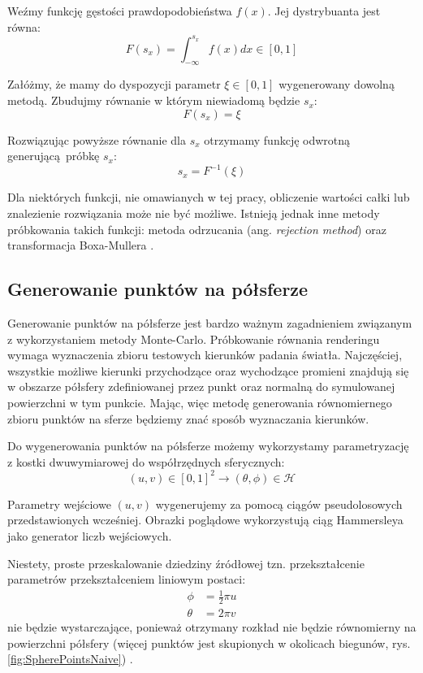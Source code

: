 \documentclass[../main.tex]{subfiles}
\begin{document}
Weźmy funkcję gęstości prawdopodobieństwa $f(x)$. Jej dystrybuanta jest równa:
\[ 
F(s_x) = \int_{-\infty}^{s_{x}} f(x) dx \in [0,1] 
\]

Załóżmy, że mamy do dyspozycji parametr $\xi \in [0,1]$ wygenerowany dowolną metodą. Zbudujmy równanie w którym niewiadomą będzie $s_x$:
\[ 
F(s_x) = \xi
\]

Rozwiązując powyższe równanie dla $s_x$ otrzymamy funkcję odwrotną generującą próbkę $s_x$:
\[
s_x = F^{-1}(\xi)
\]

Dla niektórych funkcji, nie omawianych w tej pracy, obliczenie wartości całki lub znalezienie rozwiązania może nie być możliwe. Istnieją jednak inne metody próbkowania takich funkcji: metoda odrzucania (ang. \textit{rejection method}) oraz transformacja Boxa-Mullera \cite{pbrt}.

\subsection{Generowanie punktów na półsferze}

Generowanie punktów na półsferze jest bardzo ważnym zagadnieniem związanym z wykorzystaniem metody Monte-Carlo. Próbkowanie równania renderingu wymaga wyznaczenia zbioru testowych kierunków padania światła. Najczęściej, wszystkie możliwe kierunki przychodzące oraz wychodzące promieni znajdują się w obszarze półsfery zdefiniowanej przez punkt oraz normalną do symulowanej powierzchni w tym punkcie. Mając, więc metodę generowania równomiernego zbioru punktów na sferze będziemy znać sposób wyznaczania kierunków.

Do wygenerowania punktów na półsferze możemy wykorzystamy parametryzację z kostki dwuwymiarowej do współrzędnych sferycznych:
\[
  (u,v) \in [0,1]^2 \rightarrow (\theta, \phi) \in \mathcal{H}
\]

Parametry wejściowe $(u,v)$ wygenerujemy za pomocą ciągów pseudolosowych przedstawionych wcześniej. Obrazki poglądowe wykorzystują ciąg Hammersleya jako generator liczb wejściowych.

Niestety, proste przeskalowanie dziedziny źródłowej tzn. przekształcenie parametrów przekształceniem liniowym postaci:
\begin{align*}
	\phi &= \frac{1}{2} \pi u \\
 	\theta &= 2 \pi v
\end{align*}
\noindent nie będzie wystarczające, ponieważ otrzymany rozkład nie będzie równomierny na powierzchni półsfery (więcej punktów jest skupionych w okolicach biegunów, rys. \ref{fig:SpherePointsNaive}) \cite{WolframSpherePointPicking}.
\end{document}
